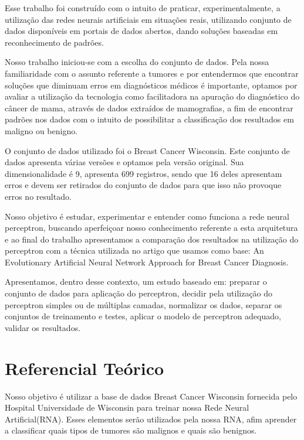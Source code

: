 \documentclass[conference]{IEEEtran}
\begin{document}
    Esse trabalho foi construído com o intuito de praticar, experimentalmente, a utilização das redes neurais artificiais em situações reais, utilizando conjunto de dados disponíveis em portais de dados abertos, dando soluções baseadas em reconhecimento de padrões.

    Nosso trabalho iniciou-se com a escolha do conjunto de dados. Pela nossa familiaridade com o assunto referente a tumores e por entendermos que encontrar soluções que diminuam erros em diagnósticos médicos é importante, optamos por avaliar a utilização da tecnologia como facilitadora na apuração do diagnóstico do câncer de mama, através de dados extraídos de mamografias, a fim de encontrar padrões nos dados com o intuito de possibilitar a classificação dos resultados em maligno ou benigno.
    
    O conjunto de dados utilizado foi o Breast Cancer Wisconsin. Este conjunto de dados apresenta várias versões e optamos pela versão original. Sua dimensionalidade é 9, apresenta 699 registros, sendo que 16 deles apresentam erros e devem ser retirados do conjunto de dados para que isso não provoque erros no resultado.
    
    Nosso objetivo é estudar, experimentar e entender como funciona a rede neural perceptron, buscando aperfeiçoar nosso conhecimento referente a esta arquitetura e ao final do trabalho apresentamos a comparação dos resultados na utilização do perceptron com a técnica utilizada no artigo que usamos como base: An Evolutionary Artificial Neural Network Approach for Breast Cancer Diagnosis.
    
    Apresentamos, dentro desse contexto, um estudo baseado em: preparar o conjunto de dados para aplicação do perceptron, decidir pela utilização do perceptron simples ou de múltiplas camadas, normalizar os dados, separar os conjuntos de treinamento e testes, aplicar o modelo de perceptron adequado, validar os resultados.


\section{Referencial Teórico}
	
	Nosso objetivo é utilizar a base de dados Breast Cancer Wisconsin \cite{b8} fornecida pelo Hospital Universidade de Wisconsin para treinar nossa Rede Neural Artificial(RNA). Esses elementos serão utilizados pela nossa RNA, afim aprender a classificar quais tipos de tumores são malignos e quais são benignos. 
	
\end{document}
